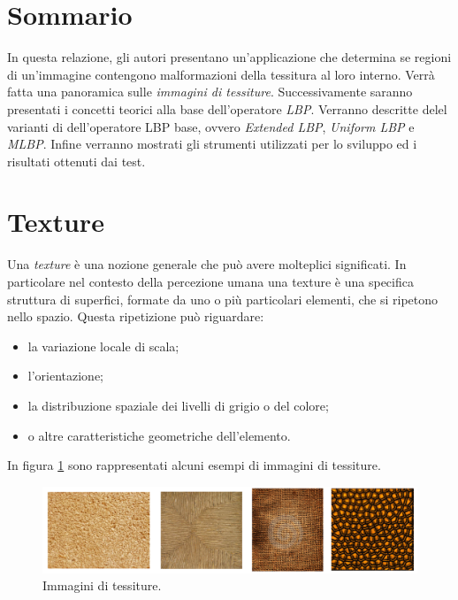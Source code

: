 \section*{Sommario}
In questa relazione, gli autori presentano un'applicazione che determina se regioni di un'immagine contengono malformazioni della tessitura al loro interno.
Verrà fatta una panoramica sulle \textit{immagini di tessiture}. Successivamente saranno presentati i concetti teorici alla base dell'operatore \textit{\acf{LBP}}. Verranno descritte delel varianti di dell'operatore \acs{LBP} base, ovvero \textit{Extended LBP}, \textit{Uniform LBP} e \textit{\acf{MLBP}}. Infine verranno mostrati gli strumenti utilizzati per lo sviluppo ed i risultati ottenuti dai test.


\newpage
\null 
\thispagestyle{empty}
\newpage


\section{Texture}

Una \textit{texture} è una nozione generale che può avere molteplici significati. In particolare nel contesto della percezione umana una texture è una specifica struttura di superfici, formate da uno o più particolari elementi, che si ripetono nello spazio.
Questa ripetizione può riguardare:

\begin{itemize}
	\item la variazione locale di scala;
	\item l'orientazione;
	\item la distribuzione spaziale dei livelli di grigio o del colore\cite{Stockman:2001:CV:558008};
	\item o altre caratteristiche geometriche dell'elemento.
\end{itemize}

\noindent In figura \ref{fig:Texture} sono rappresentati alcuni esempi di immagini di tessiture. \\

\begin{figure}[ht]
\begin{center}
\includegraphics[width=.95\textwidth]{img/Texture}
\caption{ Immagini di tessiture.}
\label{fig:Texture}
\end{center}
\end{figure}


